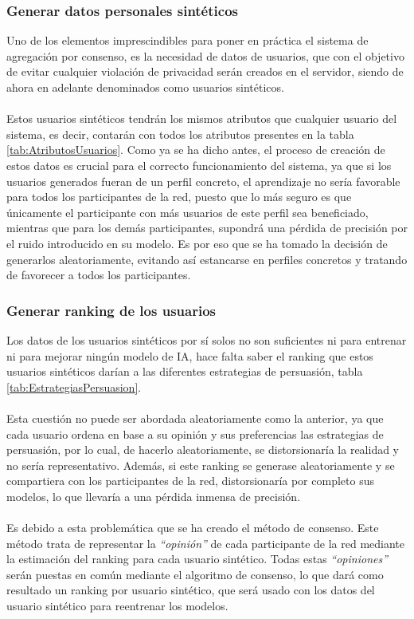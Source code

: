 \subsubsection{Generar datos personales sintéticos}\label{Consenso:Usuarios_Sinteticos}
Uno de los elementos imprescindibles para poner en práctica el sistema de agregación por consenso, es la necesidad de datos de usuarios, que con el objetivo de evitar cualquier violación de privacidad serán creados en el servidor, siendo de ahora en adelante denominados como usuarios sintéticos.
\\ \\
Estos usuarios sintéticos tendrán los mismos atributos que cualquier usuario del sistema, es decir, contarán con todos los atributos presentes en la tabla \ref{tab:AtributosUsuarios}. Como ya se ha dicho antes, el proceso de creación de estos datos es crucial para el correcto funcionamiento del sistema, ya que si los usuarios generados fueran de un perfil concreto, el aprendizaje no sería favorable para todos los participantes de la red, puesto que lo más seguro es que únicamente el participante con más usuarios de este perfil sea beneficiado, mientras que para los demás participantes, supondrá una pérdida de precisión por el ruido introducido en su modelo. Es por eso que se ha tomado la decisión de generarlos aleatoriamente, evitando así estancarse en perfiles concretos y tratando de favorecer a todos los participantes. 
\subsubsection{Generar ranking de los usuarios}
Los datos de los usuarios sintéticos por sí solos no son suficientes ni para entrenar ni para mejorar ningún modelo de IA, hace falta saber el ranking que estos usuarios sintéticos darían a las diferentes estrategias de persuasión, tabla \ref{tab:EstrategiasPersuasion}. 
\\ \\
Esta cuestión no puede ser abordada aleatoriamente como la anterior, ya que cada usuario ordena en base a su opinión y sus preferencias las estrategias de persuasión, por lo cual, de hacerlo aleatoriamente, se distorsionaría la realidad y no sería representativo. Además, si este ranking se generase aleatoriamente y se compartiera con los participantes de la red, distorsionaría por completo sus modelos, lo que llevaría a una pérdida inmensa de precisión. 
\\ \\
Es debido a esta problemática que se ha creado el método de consenso. Este método trata de representar la \textit{``opinión''} de cada participante de la red mediante la estimación del ranking para cada usuario sintético. Todas estas \textit{``opiniones''} serán puestas en común mediante el algoritmo de consenso, lo que dará como resultado un ranking por usuario sintético, que será usado con los datos del usuario sintético para reentrenar los modelos.
\newpage
